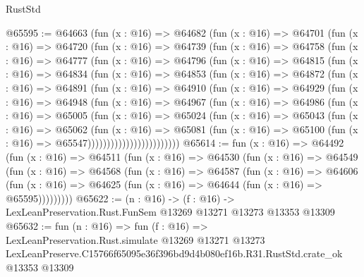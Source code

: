 \begin{lexlean}{RustStd}
\begin{coremodule}
@65595 := @64663
    (fun (x : @16) =>
    @64682
      (fun (x : @16) =>
      @64701
        (fun (x : @16) =>
        @64720
          (fun (x : @16) =>
          @64739
            (fun (x : @16) =>
            @64758
              (fun (x : @16) =>
              @64777
                (fun (x : @16) =>
                @64796
                  (fun (x : @16) =>
                  @64815
                    (fun (x : @16) =>
                    @64834
                      (fun (x : @16) =>
                      @64853
                        (fun (x : @16) =>
                        @64872
                          (fun (x : @16) =>
                          @64891
                            (fun (x : @16) =>
                            @64910
                              (fun (x : @16) =>
                              @64929
                                (fun (x : @16) =>
                                @64948
                                  (fun (x : @16) =>
                                  @64967
                                    (fun (x : @16) =>
                                    @64986
                                      (fun (x : @16) =>
                                      @65005
                                        (fun (x : @16) =>
                                        @65024
                                          (fun (x : @16) =>
                                          @65043
                                            (fun (x : @16) =>
                                            @65062
                                              (fun (x : @16) =>
                                              @65081
                                                (fun (x : @16) =>
                                                @65100
                                                  (fun (x : @16) => @65547))))))))))))))))))))))))
@65614 := fun (x : @16) =>
  @64492
    (fun (x : @16) =>
    @64511
      (fun (x : @16) =>
      @64530
        (fun (x : @16) =>
        @64549
          (fun (x : @16) =>
          @64568
            (fun (x : @16) =>
            @64587
              (fun (x : @16) =>
              @64606
                (fun (x : @16) => @64625 (fun (x : @16) => @64644 (fun (x : @16) => @65595)))))))))
@65622 := (n : @16) ->
  (f : @16) -> LexLeanPreservation.Rust.FunSem @13269 @13271 @13273 @13353 @13309
@65632 := fun (n : @16) =>
  fun (f : @16) =>
  LexLeanPreservation.Rust.simulate
    @13269
    @13271
    @13273
    LexLeanPreserve.C15766f65095e36f396bd9d4b080ef16b.R31.RustStd.crate_ok
    @13353
    @13309
\end{coremodule}
\end{lexlean}
